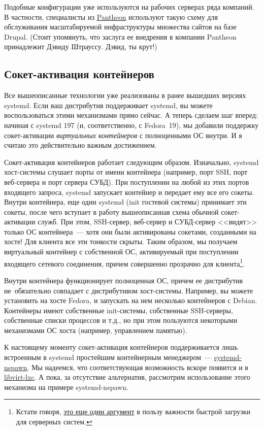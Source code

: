\documentclass[10pt,oneside,a4paper]{article}
\begin{document}
Подобные конфигурации уже используются на рабочих серверах ряда компаний. В
частности, специалисты из \href{https://www.getpantheon.com/}{Pantheon}
используют такую схему для обслуживания масштабируемой инфраструктуры множества
сайтов на базе Drupal. (Стоит упомянуть, что заслуга ее внедрения в компании 
Pantheon принадлежит Дэвиду Штрауссу. Дэвид, ты крут!)

\subsection{Сокет-активация контейнеров}

Все вышеописанные технологии уже реализованы в ранее вышедших версиях systemd.
Если ваш дистрибутив поддерживает systemd, вы можете воспользоваться этими
механизмами прямо сейчас. А теперь сделаем шаг вперед: начиная с
systemd 197 (и, соответственно, с Fedora~19), мы добавили поддержку
сокет-активации \emph{виртуальных контейнеров} с полноценными ОС внутри. И
я считаю это действительно важным достижением.

Сокет-активация контейнеров работает следующим образом. Изначально, systemd
хост-системы слушает порты от имени контейнера (например, порт SSH, порт
веб-сервера и порт сервера СУБД). При поступлении на любой из этих портов
входящего запроса, systemd запускает контейнер и передает ему все его сокеты.
Внутри контейнера, еще один systemd (init гостевой системы) принимает эти
сокеты, после чего вступает в работу вышеописанная схема обычной сокет-активации
служб. При этом, SSH-сервер, веб-сервер и СУБД-сервер <<видят>> только ОС
контейнера~--- хотя они были активированы сокетами, созданными на хосте! Для
клиента все эти тонкости скрыты. Таким образом, мы получаем виртуальный
контейнер с собственной ОС, активируемый при поступлении входящего сетевого
соединения, причем совершенно прозрачно для клиента\footnote{Кстати говоря,
\href{https://plus.google.com/115547683951727699051/posts/cVrLAJ8HYaP}{это еще
один аргумент} в пользу важности быстрой загрузки для серверных систем.}.

Внутри контейнера функционирует полноценная ОС, причем ее дистрибутив
не~обязательно совпадает с дистрибутивом хост-системы. Например, вы можете
установить на хосте Fedora, и запускать на нем несколько контейнеров с Debian.
Контейнеры имеют собственные init-системы, собственные SSH-серверы, собственные
списки процессов и т.д., но при этом пользуются некоторыми механизмами ОС хоста
(например, управлением памятью).

К настоящему моменту сокет-активация контейнеров поддерживается лишь встроенным
в systemd простейшим контейнерным менеджером~---
\hyperref[sec:chroots]{systemd-nspawn}. Мы надеемся, что соответствующая
возможность вскоре появится и в
\href{http://libvirt.org/drvlxc.html}{libvirt-lxc}. А пока, за отсутствие
альтернатив, рассмотрим использование этого механизма на примере systemd-nspawn.
\end{document}
